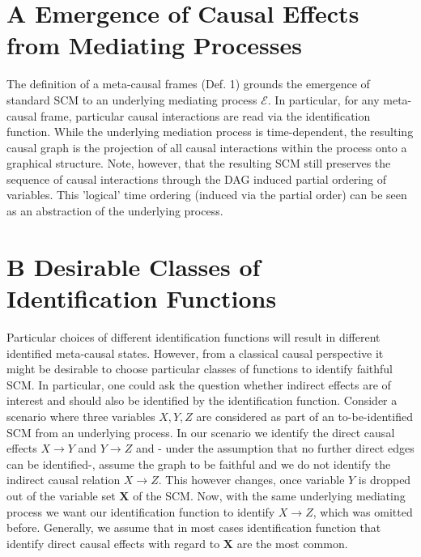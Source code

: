 \documentclass[10pt]{article}
\begin{document}
\section*{A Emergence of Causal Effects from Mediating Processes}
The definition of a meta-causal frames (Def. 1) grounds the emergence of standard SCM to an underlying mediating process $\mathcal{E}$. In particular, for any meta-causal frame, particular causal interactions are read via the identification function. While the underlying mediation process is time-dependent, the resulting causal graph is the projection of all causal interactions within the process onto a graphical structure. Note, however, that the resulting SCM still preserves the sequence of causal interactions through the DAG induced partial ordering of variables. This 'logical' time ordering (induced via the partial order) can be seen as an abstraction of the underlying process.

\section*{B Desirable Classes of Identification Functions}
Particular choices of different identification functions will result in different identified meta-causal states. However, from a classical causal perspective it might be desirable to choose particular classes of functions to identify faithful SCM. In particular, one could ask the question whether indirect effects are of interest and should also be identified by the identification function. Consider a scenario where three variables $X, Y, Z$ are considered as part of an to-be-identified SCM from an underlying process. In our scenario we identify the direct causal effects $X \rightarrow Y$ and $Y \rightarrow Z$ and - under the assumption that no further direct edges can be identified-, assume the graph to be faithful and we do not identify the indirect causal relation $X \rightarrow Z$. This however changes, once variable $Y$ is dropped out of the variable set $\mathbf{X}$ of the SCM. Now, with the same underlying mediating process we want our identification function to identify $X \rightarrow Z$, which was omitted before. Generally, we assume that in most cases identification function that identify direct causal effects with regard to $\mathbf{X}$ are the most common.
\end{document}
